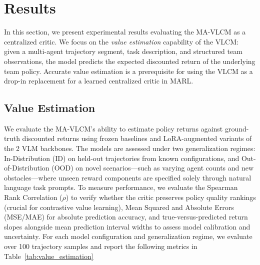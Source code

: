 \documentclass[letterpaper, 10 pt, conference]{ieeeconf}  %
\begin{document}
\begin{table}[ht]
\centering
\caption{Key MA-VLCM Hyperparameters}
\label{tab:hyperparameters}
\renewcommand{\arraystretch}{1.2}
\end{table}
\section{Results}
In this section, we present experimental results evaluating the MA-VLCM as a centralized critic. We focus on the \textit{value estimation} capability of the VLCM: given a multi-agent trajectory segment, task description, and structured team observations, the model predicts the expected discounted return of the underlying team policy. Accurate value estimation is a prerequisite for using the VLCM as a drop-in replacement for a learned centralized critic in MARL.

\subsection{Value Estimation}
\label{subsec:value_estimation}
We evaluate the MA-VLCM's ability to estimate policy returns against ground-truth discounted returns using frozen baselines and LoRA-augmented variants of the 2 VLM backbones. The models are assessed under two generalization regimes: In-Distribution (ID) on held-out trajectories from known configurations, and Out-of-Distribution (OOD) on novel scenarios—such as varying agent counts and new obstacles—where unseen reward components are specified solely through natural language task prompts. To measure performance, we evaluate the Spearman Rank Correlation ($\rho$) to verify whether the critic preserves policy quality rankings (crucial for contrastive value learning), Mean Squared and Absolute Errors (MSE/MAE) for absolute prediction accuracy, and true-versus-predicted return slopes alongside mean prediction interval widths to assess model calibration and uncertainty. For each model configuration and generalization regime, we evaluate over 100 trajectory samples and report the following metrics in Table~\ref{tab:value_estimation}
\end{document}
